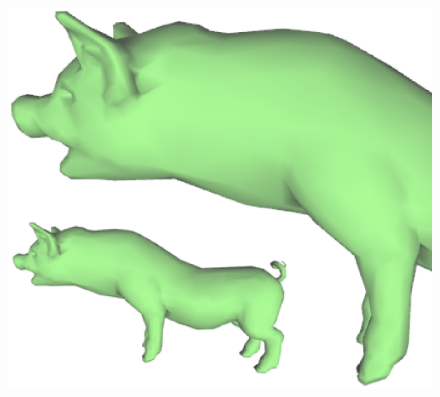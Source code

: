 \begin{figure} [htbp]
{\begin{minipage}[b]{0.23\textwidth}
      \includegraphics[scale=0.18]{figs/f5.10.PigMat3.eps}
    \end{minipage}}
  \subfigure[]{
    \centering
}
\end{figure}

